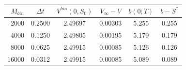 \begin{tabular}{rccccc}
\toprule
$M_{bin}$ & $\Delta t$ & $V^{bin}(0,S_0)$ & $V_\infty-V$ & $b(0;T)$ & $b-S^*$ \\
\midrule
2000 & 0.2500 & 2.49697 & 0.00303 & 5.255 & 0.255 \\
4000 & 0.1250 & 2.49805 & 0.00195 & 5.179 & 0.179 \\
8000 & 0.0625 & 2.49915 & 0.00085 & 5.126 & 0.126 \\
16000 & 0.0312 & 2.49915 & 0.00085 & 5.089 & 0.089 \\
\bottomrule
\end{tabular}
